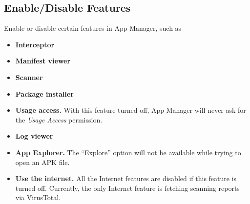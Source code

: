 \subsection{Enable/Disable Features}\label{subsec:enable/disable-features} %
Enable or disable certain features in App Manager, such as
\begin{itemize}
    \item \textbf{Interceptor}
    \item \textbf{Manifest viewer}
    \item \textbf{Scanner}
    \item \textbf{Package installer}
    \item \textbf{Usage access.} With this feature turned off, App Manager will never ask for the \textit{Usage Access} permission.
    \item \textbf{Log viewer}
    \item \textbf{App Explorer.} The ``Explore'' option will not be available while trying to open an APK file.
    \item \textbf{Use the internet.} All the Internet features are disabled if this feature is turned off.
    Currently, the only Internet feature is fetching scanning reports via VirusTotal.
\end{itemize}


